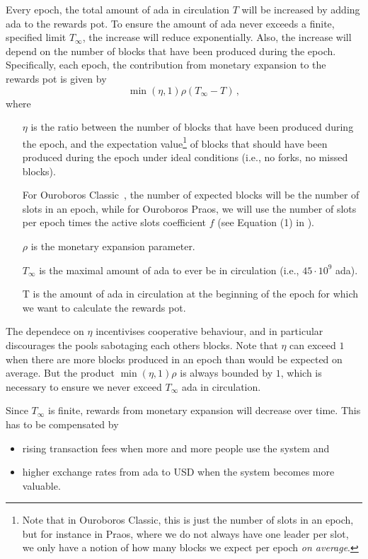 \documentclass[11pt,a4paper,dvipsnames,twosided]{article}
\begin{document}
Every epoch, the total amount of ada in circulation \(T\) will be increased by
adding ada to the rewards pot. To ensure the amount of ada never exceeds a
finite, specified limit \(T_\infty\), the increase will reduce exponentially.
Also, the increase will depend on the number of blocks that have been produced
during the epoch. Specifically, each epoch, the contribution from monetary
expansion to the rewards pot is given by
\[\min(\eta, 1) \rho \left(T_\infty - T\right)\,,\]
where
\begin{itemize}
\item[\(\eta\)] is the ratio between the number of blocks that have been produced
  during the epoch, and the expectation value\footnote{Note that in Ouroboros
    Classic, this is just the number of slots in an epoch, but for instance in
    Praos, where we do not always have one leader per slot, we only have a
    notion of how many blocks we expect per epoch \emph{on average}.} of blocks
  that should have been produced during the epoch under ideal conditions (i.e.,
  no forks, no missed blocks).

  For Ouroboros Classic~\citep{ouroboros_classic}, the number of expected blocks
  will be the number of slots in an epoch, while for Ouroboros Praos, we will
  use the number of slots per epoch times the active slots coefficient \(f\)
  (see Equation (1) in \citep{ouroboros_praos}).
\item[\(\rho\)] is the monetary expansion parameter.
\item[\(T_\infty\)] is the maximal amount of ada to ever be in circulation
  (i.e., \(45\cdot10^{9}\) ada).
\item[T] is the amount of ada in circulation at the beginning of the epoch for
  which we want to calculate the rewards pot.
\end{itemize}

The dependece on \(\eta\) incentivises cooperative behaviour, and in particular
discourages the pools sabotaging each others blocks. Note that \(\eta\) can
exceed \(1\) when there are more blocks produced in an epoch than would be
expected on average. But the product \(\min(\eta, 1)\rho\) is always bounded by
\(1\), which is necessary to ensure we never exceed \(T_\infty\) ada in
circulation.

Since \(T_\infty\) is finite, rewards from monetary expansion will
decrease over time. This has to be compensated by

\begin{itemize}
\item
  rising transaction fees when more and more people use the system and
\item
  higher exchange rates from ada to USD when the system becomes more
  valuable.
\end{itemize}
\end{document}
